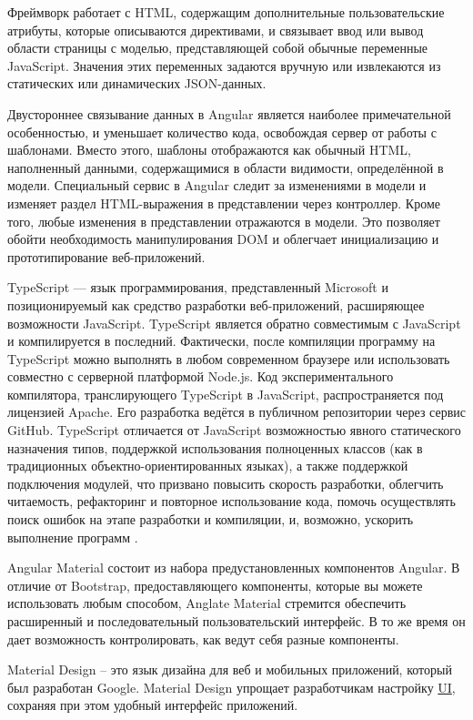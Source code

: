 Фреймворк работает с HTML, содержащим дополнительные пользовательские атрибуты, которые описываются директивами, и связывает ввод или вывод области страницы с моделью, представляющей собой обычные переменные JavaScript.
Значения этих переменных задаются вручную или извлекаются из статических или динамических JSON-данных.

Двустороннее связывание данных в Angular является наиболее примечательной особенностью, и уменьшает количество кода, освобождая сервер от работы с шаблонами.
Вместо этого, шаблоны отображаются как обычный HTML, наполненный данными, содержащимися в области видимости, определённой в модели.
Специальный сервис в Angular следит за изменениями в модели и изменяет раздел HTML-выражения в представлении через контроллер.
Кроме того, любые изменения в представлении отражаются в модели.
Это позволяет обойти необходимость манипулирования DOM и облегчает инициализацию и прототипирование веб-приложений.\cite{web-angular}

TypeScript — язык программирования, представленный Microsoft и позиционируемый как средство разработки веб-приложений, расширяющее возможности JavaScript.
TypeScript является обратно совместимым с JavaScript и компилируется в последний.
Фактически, после компиляции программу на TypeScript можно выполнять в любом современном браузере или использовать совместно с серверной платформой Node.js.
Код экспериментального компилятора, транслирующего TypeScript в JavaScript, распространяется под лицензией Apache.
Его разработка ведётся в публичном репозитории через сервис GitHub.
TypeScript отличается от JavaScript возможностью явного статического назначения типов, поддержкой использования полноценных классов (как в традиционных объектно-ориентированных языках), а также поддержкой подключения модулей, что призвано повысить скорость разработки, облегчить читаемость, рефакторинг и повторное использование кода, помочь осуществлять поиск ошибок на этапе разработки и компиляции, и, возможно, ускорить выполнение программ \cite{web-typescript}.

Angular Material состоит из набора предустановленных компонентов Angular.
В отличие от Bootstrap, предоставляющего компоненты, которые вы можете использовать любым способом, Anglate Material стремится обеспечить расширенный и последовательный пользовательский интерфейс.
В то же время он дает возможность контролировать, как ведут себя разные компоненты.

Material Design – это язык дизайна для веб и мобильных приложений, который был разработан Google.
Material Design упрощает разработчикам настройку \hyperlink{gloss:ui}{UI}, сохраняя при этом удобный интерфейс приложений.


